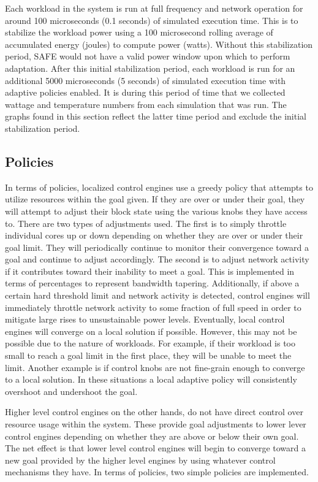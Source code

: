         Each workload in the system is run at full frequency and network operation for around 100 microseconds (0.1 seconds) of simulated execution time. This is to stabilize the workload power using a 100 microsecond rolling average of accumulated energy (joules) to compute power (watts). Without this stabilization period, SAFE would not have a valid power window upon which to perform adaptation. After this initial stabilization period, each workload is run for an additional 5000 microseconds (5 seconds) of simulated execution time with adaptive policies enabled. It is during this period of time that we collected wattage and temperature numbers from each simulation that was run. The graphs found in this section reflect the latter time period and exclude the initial stabilization period.
    \subsection{Policies}
        \label{sec:policies}
        In terms of policies, localized control engines use a greedy policy that attempts to utilize resources within the goal given. If they are over or under their goal, they will attempt to adjust their block state using the various knobs they have access to. There are two types of adjustments used. The first is to simply throttle individual cores up or down depending on whether they are over or under their goal limit. They will periodically continue to monitor their convergence toward a goal and continue to adjust accordingly. The second is to adjust network activity if it contributes toward their inability to meet a goal. This is implemented in terms of percentages to represent bandwidth tapering. Additionally, if above a certain hard threshold limit and network activity is detected, control engines will immediately throttle network activity to some fraction of full speed in order to mitigate large rises to unsustainable power levels. Eventually, local control engines will converge on a local solution if possible. However, this may not be possible due to the nature of workloads. For example, if their workload is too small to reach a goal limit in the first place, they will be unable to meet the limit. Another example is if control knobs are not fine-grain enough to converge to a local solution. In these situations a local adaptive policy will consistently overshoot and undershoot the goal.

        Higher level control engines on the other hands, do not have direct control over resource usage within the system. These provide goal adjustments to lower lever control engines depending on whether they are above or below their own goal. The net effect is that lower level control engines will begin to converge toward a new goal provided by the higher level engines by using whatever control mechanisms they have. In terms of policies, two simple policies are implemented.
        
